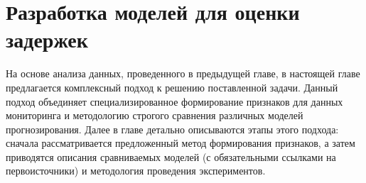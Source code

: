 \chapter{Разработка моделей для оценки задержек}
\label{ch:modeling}

На основе анализа данных, проведенного в предыдущей главе, в настоящей главе предлагается комплексный подход к решению поставленной задачи. Данный подход объединяет специализированное формирование признаков для данных мониторинга и методологию строгого сравнения различных моделей прогнозирования. Далее в главе детально описываются этапы этого подхода: сначала рассматривается предложенный метод формирования признаков, а затем приводятся описания сравниваемых моделей (с обязательными ссылками на первоисточники) и методология проведения экспериментов.


